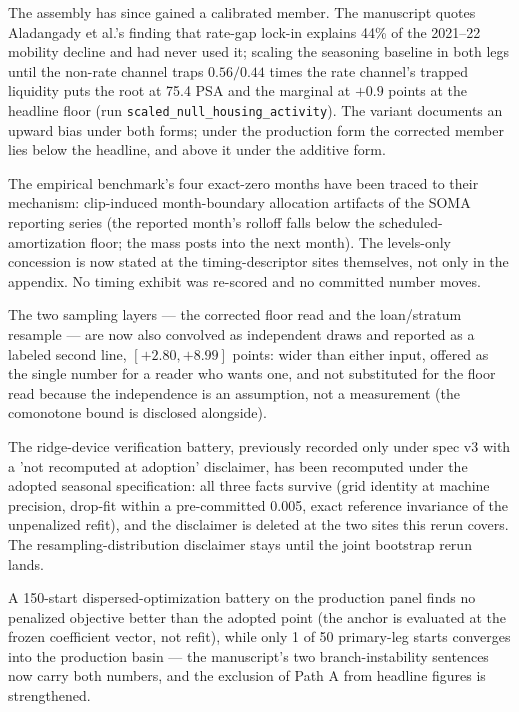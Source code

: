 \documentclass[11pt]{article}
\begin{document}
The assembly has since gained a calibrated member. The manuscript quotes Aladangady
et al.'s finding that rate-gap lock-in explains 44\% of the 2021--22 mobility decline
and had never used it; scaling the seasoning baseline in both legs until the non-rate
channel traps $0.56/0.44$ times the rate channel's trapped liquidity puts the root at
75.4 PSA and the marginal at $+0.9$ points at the headline floor (run
\texttt{scaled\_null\_housing\_activity}). The variant documents an upward bias under both forms; under the
production form the corrected member lies below the headline, and above it
under the additive form.

The empirical benchmark's four exact-zero months have been traced to their
mechanism: clip-induced month-boundary allocation artifacts of the SOMA reporting
series (the reported month's rolloff falls below the scheduled-amortization floor;
the mass posts into the next month). The levels-only concession is now stated at
the timing-descriptor sites themselves, not only in the appendix. No timing
exhibit was re-scored and no committed number moves.

The two sampling layers --- the corrected floor read and the loan/stratum
resample --- are now also convolved as independent draws and reported as a
labeled second line, $[+2.80, +8.99]$ points: wider than either input, offered
as the single number for a reader who wants one, and not substituted for the
floor read because the independence is an assumption, not a measurement (the
comonotone bound is disclosed alongside).

The ridge-device verification battery, previously recorded only under spec v3
with a 'not recomputed at adoption' disclaimer, has been recomputed under the
adopted seasonal specification: all three facts survive (grid identity at
machine precision, drop-fit within a pre-committed 0.005, exact reference
invariance of the unpenalized refit), and the disclaimer is deleted at the two
sites this rerun covers. The resampling-distribution disclaimer stays until the
joint bootstrap rerun lands.

A 150-start dispersed-optimization battery on the production panel finds no
penalized objective better than the adopted point (the anchor is evaluated at
the frozen coefficient vector, not refit), while only 1 of 50 primary-leg
starts converges into the production basin --- the manuscript's two
branch-instability sentences now carry both numbers, and the exclusion of
Path A from headline figures is strengthened.
\end{document}
